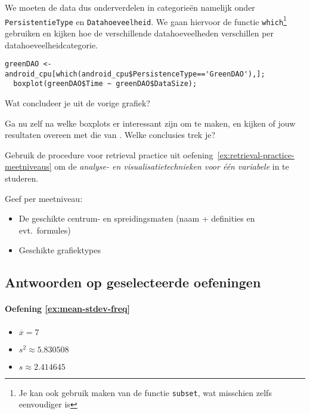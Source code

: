 We moeten de data dus onderverdelen in categorie\"en namelijk onder \texttt{PersistentieType} en \texttt{Datahoeveelheid}. We gaan hiervoor de functie \texttt{which}\footnote{Je kan ook gebruik maken van de functie \texttt{subset}, wat misschien zelfs eenvoudiger is} gebruiken en kijken hoe de verschillende datahoeveelheden verschillen per datahoeveelheidcategorie. 

\begin{lstlisting}[breaklines=true]
  greenDAO <- android_cpu[which(android_cpu$PersistenceType=='GreenDAO'),];
  boxplot(greenDAO$Time ~ greenDAO$DataSize);
\end{lstlisting}

\begin{exercise}
  Wat concludeer je uit de vorige grafiek?
\end{exercise}

\begin{exercise}
  Ga nu zelf na welke boxplots er interessant zijn om te maken, en kijken of jouw resultaten overeen met die van \textcite{Akin2016}. Welke conclusies trek je?
\end{exercise}

\begin{exercise}
  Gebruik de procedure voor retrieval practice uit oefening~\ref{ex:retrieval-practice-meetniveaus} om de \emph{analyse- en visualisatietechnieken voor één variabele} in te studeren.
  
  Geef per meetniveau:
  
  \begin{itemize}
    \item De geschikte centrum- en spreidingsmaten (naam + definities en evt.~formules)
    \item Geschikte grafiektypes
  \end{itemize}
\end{exercise}





\subsection{Antwoorden op geselecteerde oefeningen}

\paragraph{Oefening \ref{ex:mean-stdev-freq}}

\begin{itemize}
  \item $\overline{x} = 7$
  \item $s^2 \approx 5.830508$
  \item $s \approx 2.414645$
\end{itemize}


